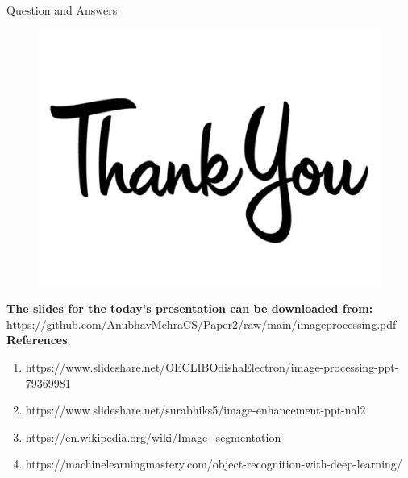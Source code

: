 \documentclass[12pt]{beamer}
\begin{document}
\begin{frame}{Question and Answers}
\begin{figure}
\begin{center}
\includegraphics[scale=0.2]{thank.jpg}
\end{center}
\end{figure}
\tiny
\textbf{The slides for the today's presentation can be downloaded from:} \\

https://github.com/AnubhavMehraCS/Paper2/raw/main/imageprocessing.pdf \\ [1ex]
\small
\textbf{References}:
\tiny
\begin{enumerate}
\item https://www.slideshare.net/OECLIBOdishaElectron/image-processing-ppt-79369981
\item https://www.slideshare.net/surabhiks5/image-enhancement-ppt-nal2
\item https://en.wikipedia.org/wiki/Image\_segmentation
\item https://machinelearningmastery.com/object-recognition-with-deep-learning/
\end{enumerate}
\normalsize
\end{frame}
\end{document}
